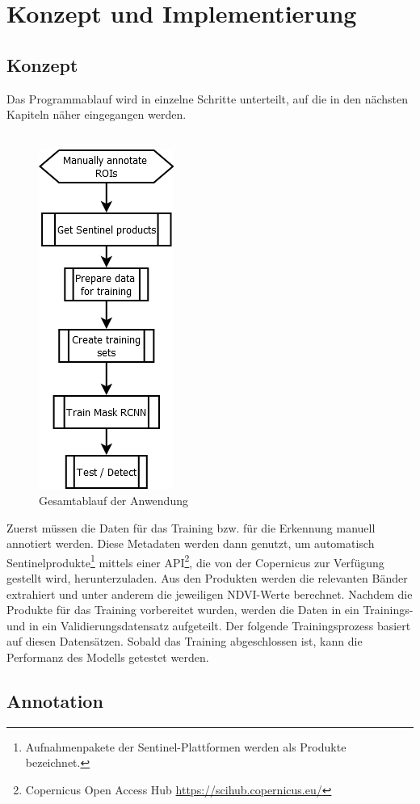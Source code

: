 \chapter{Konzept und Implementierung}\label{chap:concept}

\section{Konzept}\label{sec:concept}

Das Programmablauf wird in einzelne Schritte unterteilt, auf die in den nächsten Kapiteln näher eingegangen werden.
\\\\
\begin{figure}[ht]
  \centering
  \includegraphics[width=.2\textwidth]{pics/overview.PNG}
  \caption{Gesamtablauf der Anwendung}
  \label{fig:overview}
\end{figure}
Zuerst müssen die Daten für das Training bzw. für die Erkennung manuell annotiert werden. Diese Metadaten werden dann genutzt, um automatisch Sentinelprodukte\footnote{Aufnahmenpakete der Sentinel-Plattformen werden als Produkte bezeichnet.} mittels einer API\footnote{Copernicus Open Access Hub \url{https://scihub.copernicus.eu/}}, die von der Copernicus zur Verfügung gestellt wird, herunterzuladen. Aus den Produkten werden die relevanten Bänder extrahiert und unter anderem die jeweiligen NDVI-Werte berechnet. Nachdem die Produkte für das Training vorbereitet wurden, werden die Daten in ein Trainings- und in ein Validierungsdatensatz aufgeteilt. Der folgende Trainingsprozess basiert auf diesen Datensätzen. Sobald das Training abgeschlossen ist, kann die Performanz des Modells getestet werden. 

\section{Annotation}\label{sec:annotation}

